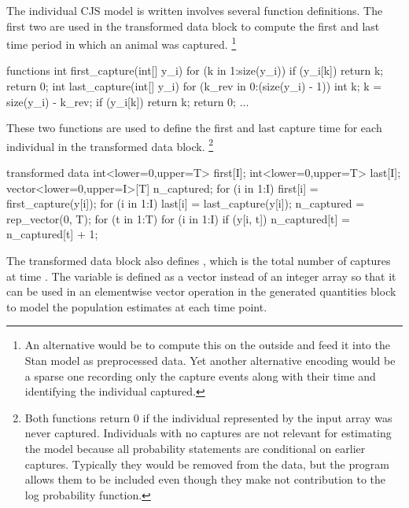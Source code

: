 The individual CJS model is written involves several function
definitions.  The first two are used in the transformed data block to
compute the first and last time period in which an animal was
captured.%
%
\footnote{An alternative would be to compute this on the outside and
feed it into the Stan model as preprocessed data.  Yet another
alternative encoding would be a sparse one recording only the
capture events along with their time and identifying the individual
captured.} 
%
\begin{stancode}
functions {
  int first_capture(int[] y_i) {
    for (k in 1:size(y_i))
      if (y_i[k])
        return k;
    return 0;
  }
  int last_capture(int[] y_i) { 
    for (k_rev in 0:(size(y_i) - 1)) {
      int k;
      k = size(y_i) - k_rev;
      if (y_i[k]) 
        return k;
    }
    return 0;
  }
  ...
}
\end{stancode}
%
These two functions are used to define the first and last capture time
for each individual in the transformed data block.%
%
\footnote{Both functions return 0 if the individual represented by the
  input array was never captured.  Individuals with no captures are
  not relevant for estimating the model because all probability
  statements are conditional on earlier captures.  Typically they
  would be removed from the data, but the program allows them to be
  included even though they make not contribution to the log
  probability function.}
%
\begin{stancode}
transformed data {
  int<lower=0,upper=T> first[I];
  int<lower=0,upper=T> last[I];
  vector<lower=0,upper=I>[T] n_captured;
  for (i in 1:I)
    first[i] = first_capture(y[i]);
  for (i in 1:I)
    last[i] = last_capture(y[i]);
  n_captured = rep_vector(0, T);
  for (t in 1:T)
    for (i in 1:I)
      if (y[i, t]) 
        n_captured[t] = n_captured[t] + 1;
}
\end{stancode}
%
The transformed data block also defines , which is
the total number of captures at time .  The variable
 is defined as a vector instead of an integer array
so that it can be used in an elementwise vector operation in the generated
quantities block to model the population estimates at each time point.

